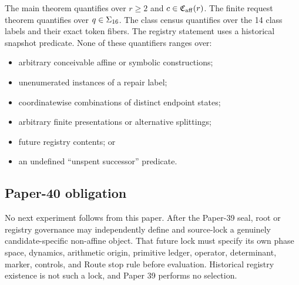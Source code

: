 The main theorem quantifies over $r\ge2$ and $c\in\mathfrak{C}_{\mathrm{aff}}(r)$.  The finite request
theorem quantifies over $q\in\Sigma_{16}$.  The class census quantifies over the
14 class labels and their exact token fibers.  The registry statement uses a
historical snapshot predicate.  None of these quantifiers ranges over:
\begin{itemize}
  \item arbitrary conceivable affine or symbolic constructions;
  \item unenumerated instances of a repair label;
  \item coordinatewise combinations of distinct endpoint states;
  \item arbitrary finite presentations or alternative splittings;
  \item future registry contents; or
  \item an undefined “unspent successor” predicate.
\end{itemize}

\subsection{Paper-40 obligation}

No next experiment follows from this paper.  After the Paper-39 seal, root or
registry governance may independently define and source-lock a genuinely
candidate-specific non-affine object.  That future lock must specify its own
phase space, dynamics, arithmetic origin, primitive ledger, operator,
determinant, marker, controls, and Route stop rule before evaluation.  Historical
registry existence is not such a lock, and Paper 39 performs no selection.
